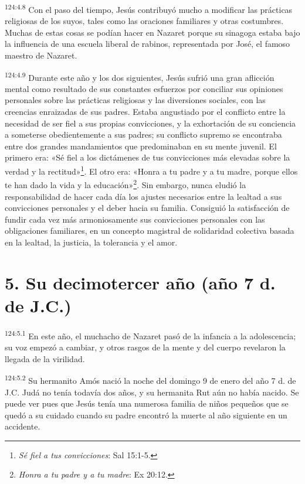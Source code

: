 \par
\textsuperscript{124:4.8} Con el paso del tiempo, Jesús contribuyó mucho a modificar las prácticas religiosas de los suyos, tales como las oraciones familiares y otras costumbres. Muchas de estas cosas se podían hacer en Nazaret porque su sinagoga estaba bajo la influencia de una escuela liberal de rabinos, representada por José, el famoso maestro de Nazaret.

\par
\textsuperscript{124:4.9} Durante este año y los dos siguientes, Jesús sufrió una gran aflicción mental como resultado de sus constantes esfuerzos por conciliar sus opiniones personales sobre las prácticas religiosas y las diversiones sociales, con las creencias enraizadas de sus padres. Estaba angustiado por el conflicto entre la necesidad de ser fiel a sus propias convicciones, y la exhortación de su conciencia a someterse obedientemente a sus padres; su conflicto supremo se encontraba entre dos grandes mandamientos que predominaban en su mente juvenil. El primero era: «Sé fiel a los dictámenes de tus convicciones más elevadas sobre la verdad y la rectitud»\footnote{\textit{Sé fiel a tus convicciones}: Sal 15:1-5.}. El otro era: «Honra a tu padre y a tu madre, porque ellos te han dado la vida y la educación»\footnote{\textit{Honra a tu padre y a tu madre}: Ex 20:12.}. Sin embargo, nunca eludió la responsabilidad de hacer cada día los ajustes necesarios entre la lealtad a sus convicciones personales y el deber hacia su familia. Consiguió la satisfacción de fundir cada vez más armoniosamente sus convicciones personales con las obligaciones familiares, en un concepto magistral de solidaridad colectiva basada en la lealtad, la justicia, la tolerancia y el amor.

\section*{5. Su decimotercer año (año 7 d. de J.C.)}
\par
\textsuperscript{124:5.1} En este año, el muchacho de Nazaret pasó de la infancia a la adolescencia; su voz empezó a cambiar, y otros rasgos de la mente y del cuerpo revelaron la llegada de la virilidad.

\par
\textsuperscript{124:5.2} Su hermanito Amós nació la noche del domingo 9 de enero del año 7 d. de J.C. Judá no tenía todavía dos años, y su hermanita Rut aún no había nacido. Se puede ver pues que Jesús tenía una numerosa familia de niños pequeños que se quedó a su cuidado cuando su padre encontró la muerte al año siguiente en un accidente.

